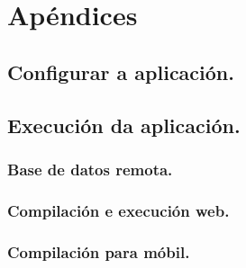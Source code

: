 \newpage
\chapter*{Apéndices}
\thispagestyle{empty}
\newpage
  \section{Configurar a aplicación.}
  \section{Execución da aplicación.}
    \subsection{Base de datos remota.}
    \subsection{Compilación e execución web.}
    \subsection{Compilación para móbil.}
\thispagestyle{empty}
